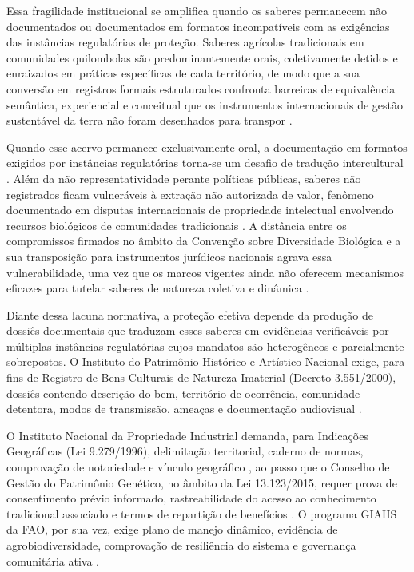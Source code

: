 \documentclass[preprint,12pt,authoryear]{elsarticle}
\begin{document}
Essa fragilidade institucional se amplifica quando os saberes permanecem não documentados ou documentados em formatos incompatíveis com as exigências das instâncias regulatórias de proteção. Saberes agrícolas tradicionais em comunidades quilombolas são predominantemente orais, coletivamente detidos e enraizados em práticas específicas de cada território, de modo que a sua conversão em registros formais estruturados confronta barreiras de equivalência semântica, experiencial e conceitual que os instrumentos internacionais de gestão sustentável da terra não foram desenhados para transpor \citep{Altieri2004,ReyesGarcia2013}.

Quando esse acervo permanece exclusivamente oral, a documentação em formatos exigidos por instâncias regulatórias torna-se um desafio de tradução intercultural \citep{Santilli2009}. Além da não representatividade perante políticas públicas, saberes não registrados ficam vulneráveis à extração não autorizada de valor, fenômeno documentado em disputas internacionais de propriedade intelectual envolvendo recursos biológicos de comunidades tradicionais \citep{Wynberg2015}. A distância entre os compromissos firmados no âmbito da Convenção sobre Diversidade Biológica e a sua transposição para instrumentos jurídicos nacionais agrava essa vulnerabilidade, uma vez que os marcos vigentes ainda não oferecem mecanismos eficazes para tutelar saberes de natureza coletiva e dinâmica \citep{Laird2020}.

Diante dessa lacuna normativa, a proteção efetiva depende da produção de dossiês documentais que traduzam esses saberes em evidências verificáveis por múltiplas instâncias regulatórias cujos mandatos são heterogêneos e parcialmente sobrepostos. O Instituto do Patrimônio Histórico e Artístico Nacional exige, para fins de Registro de Bens Culturais de Natureza Imaterial (Decreto 3.551/2000), dossiês contendo descrição do bem, território de ocorrência, comunidade detentora, modos de transmissão, ameaças e documentação audiovisual \citep{IPHAN2006}. 

O Instituto Nacional da Propriedade Industrial demanda, para Indicações Geográficas (Lei 9.279/1996), delimitação territorial, caderno de normas, comprovação de notoriedade e vínculo geográfico \citep{Brasil1996}, ao passo que o Conselho de Gestão do Patrimônio Genético, no âmbito da Lei 13.123/2015, requer prova de consentimento prévio informado, rastreabilidade do acesso ao conhecimento tradicional associado e termos de repartição de benefícios \citep{Brasil2015}. O programa GIAHS da FAO, por sua vez, exige plano de manejo dinâmico, evidência de agrobiodiversidade, comprovação de resiliência do sistema e governança comunitária ativa \citep{FAO2018}.
\end{document}
